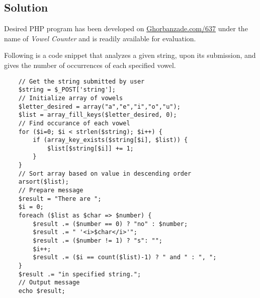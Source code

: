 \subsection*{Solution}
Desired PHP program has been developed on \href{http://ghorbanzade.com/cs637?p=2&s=2}{Ghorbanzade.com/637} under the name of \textit{Vowel Counter} and is readily available for evaluation.

Following is a code snippet that analyzes a given string, upon its submission, and gives the number of occurrences of each specified vowel.

\begin{lstlisting}
	// Get the string submitted by user
	$string = $_POST['string'];
	// Initialize array of vowels
	$letter_desired = array("a","e","i","o","u");
	$list = array_fill_keys($letter_desired, 0);
	// Find occurance of each vowel
	for ($i=0; $i < strlen($string); $i++) {
		if (array_key_exists($string[$i], $list)) {
			$list[$string[$i]] += 1;
		}
	}
	// Sort array based on value in descending order 
	arsort($list);
	// Prepare message
	$result = "There are ";
	$i = 0;
	foreach ($list as $char => $number) {
		$result .= ($number == 0) ? "no" : $number;
		$result .= " '<i>$char</i>'";
		$result .= ($number != 1) ? "s": "";
		$i++;
		$result .= ($i == count($list)-1) ? " and " : ", ";
	}
	$result .= "in specified string.";
	// Output message
	echo $result;
\end{lstlisting}
